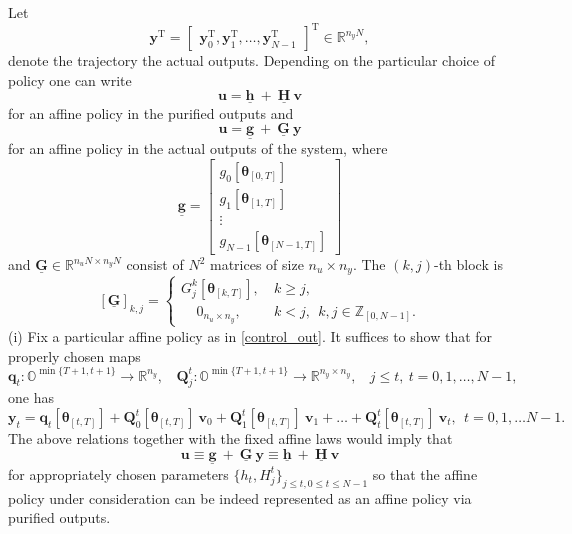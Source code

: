 \documentclass[letterpaper,11pt]{article}
\newcommand{\AR}[2]{\left[\begin{array}{#1}#2\end{array}\right]}
\newcommand{\T}{\mathrm{T}}
\begin{document}
Let 
$$\mathbf{y}^\T = \AR{cccc}{\mathbf{y}_0^\T, \mathbf{y}_1^\T, \hdots, \mathbf{y}_{N-1}^\T}^\T \in \mathbb{R}^{n_y  N},$$
denote the trajectory 
the actual outputs.
Depending on the particular choice of  policy one can write
\begin{equation}
\label{ vector_u_pure_out}
\mathbf{u} =\underline{\mathbf{h}} ~+~ \underline{\mathbf{H}} ~ \mathbf{v}
\end{equation}
for an affine policy in the purified outputs and 
\begin{equation}
\label{ vector_u_out}
\mathbf{u} =\underline{\mathbf{g}} ~+~ \underline{\mathbf{G}} ~ \mathbf{y}
\end{equation}
for an affine policy in the actual outputs of the system, 
where 
$$
\underline{\mathbf{g}} = \AR{c}{g_0[\bm{\theta}_{[0,T]}] \\  g_1[\bm{\theta}_{[1,T]}] \\ \vdots \\ g_{N-1}[\bm{\theta}_{[N-1,T]}]}
$$
and
$\underline{\mathbf{G}} \in \mathbb{R}^{n_u  N \times n_y  N} $ consist of $N^2$ matrices of size $ n_u \times n_y$.
The $(k,j)$-th block is
$$
[\underline{\mathbf{G}}]_{k,j} = 	\begin{cases}
G_j^k[\bm{\theta}_{[k,T]}], ~& k \geq j, \\
~~~~~0_{n_u \times n_y}, ~& k < j,~~ k,j \in \mathbb{Z}_{[0,N-1]}.
\end{cases}
$$	
(i) Fix a particular affine policy as in \eqref{control_out}. It suffices to show that for
properly chosen maps 
\begin{equation}
\mathbf{q}_{t} :  \mathbb{O}^{\min{\{T+1,t+1\}}} \rightarrow \mathbb{R}^{n_y},~~~~ 
\mathbf{Q}_j^t :  \mathbb{O}^{\min{\{T+1,t+1\}}} \rightarrow \mathbb{R}^{n_y \times n_y}, ~~~~j \leq t, ~
t =0,1, \hdots, N-1,
\end{equation}
one has 
\begin{equation}
\label{pure2out}
\mathbf{y}_t = \mathbf{q}_{t}[\bm{\theta}_{[t,T]}] + \mathbf{Q}_0^t[\bm{\theta}_{[t,T]}] ~ \mathbf{v}_0 + 
\mathbf{Q}_1^t[\bm{\theta}_{[t,T]}] ~ \mathbf{v}_1 + \hdots + \mathbf{Q}_t^t[\bm{\theta}_{[t,T]}] ~ \mathbf{v}_t, ~~ t =0,1, \hdots N-1 .
\end{equation}
The above relations together with the fixed affine laws would imply that
\begin{equation}
\label{equivalence_laws}
\mathbf{u} \equiv \underline{\mathbf{g}} ~+~ \underline{\mathbf{G}} ~ \mathbf{y} \equiv 
\underline{\mathbf{h}} ~+~ \underline{\mathbf{H}} ~ \mathbf{v}
\end{equation}
for appropriately chosen parameters $\{ h_{t}, H_j^t \}_{j \leq t,0 \leq t \leq N-1}$ 
so that the affine policy under consideration can be indeed 
represented as an affine policy via purified outputs. 
\end{document}

